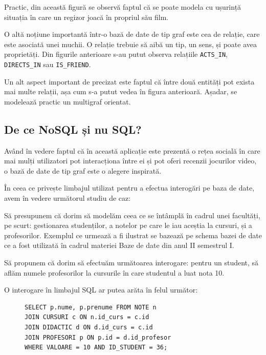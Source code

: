 \documentclass[12pt,a4paper]{report}
\begin{document}
Practic, din această figură se observă faptul că se poate modela cu ușurință situația în care un regizor joacă în propriul său film.

O altă noțiune importantă într-o bază de date de tip graf este cea de relație, care este asociată unei muchii. 
O relație trebuie să aibă un tip, un sens, și poate avea proprietăți.
Din figurile anterioare s-au putut observa relațiile \texttt{ACTS\_IN}, \texttt{DIRECTS\_IN} sau \texttt{IS\_FRIEND}.

Un alt aspect important de precizat este faptul că între două entități pot exista mai multe relații, așa cum s-a putut vedea în figura anterioară. Așadar, se modelează practic un multigraf orientat.

\subsection{De ce NoSQL și nu SQL?}

Având în vedere faptul că în această aplicație este prezentă o rețea socială în care mai mulți utilizatori pot interacționa între ei și pot oferi recenzii jocurilor video, o bază de date de tip graf este o alegere inspirată.

În ceea ce privește limbajul utilizat pentru a efectua interogări pe baza de date, avem în vedere următorul studiu de caz:

\bigskip

Să presupunem că dorim să modelăm ceea ce se întâmplă în cadrul unei facultăți, pe scurt: gestionarea studenților, a notelor pe care le iau aceștia la cursuri, și a profesorilor.
Exemplul ce urmează a fi ilustrat se bazează pe schema bazei de date ce a fost utilizată în cadrul materiei Baze de date din anul II semestrul I. \cite{7}

Să propunem că dorim să efectuăm următoarea interogare: pentru un student, să aflăm numele profesorilor la cursurile în care studentul a luat nota 10.

O interogare în limbajul SQL ar putea arăta în felul următor:

\begin{figure}[H]
\centering
\begin{BVerbatim}
SELECT p.nume, p.prenume FROM NOTE n 
JOIN CURSURI c ON n.id_curs = c.id
JOIN DIDACTIC d ON d.id_curs = c.id
JOIN PROFESORI p ON p.id = d.id_profesor
WHERE VALOARE = 10 AND ID_STUDENT = 36;
\end{BVerbatim}
\end{figure}
\end{document}

